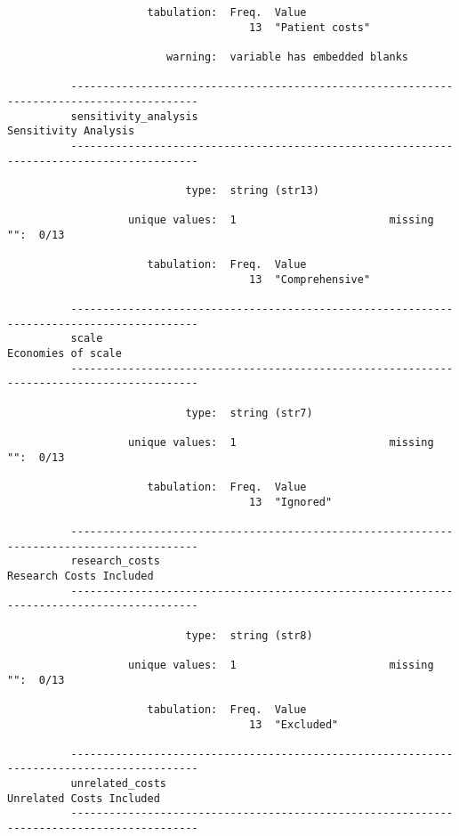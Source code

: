 \documentclass{article}
\begin{document}
\begin{verbatim}
                      tabulation:  Freq.  Value
                                      13  "Patient costs"
          
                         warning:  variable has embedded blanks
          
          ------------------------------------------------------------------------------------------
          sensitivity_analysis                                                  Sensitivity Analysis
          ------------------------------------------------------------------------------------------
          
                            type:  string (str13)
          
                   unique values:  1                        missing "":  0/13
          
                      tabulation:  Freq.  Value
                                      13  "Comprehensive"
          
          ------------------------------------------------------------------------------------------
          scale                                                                   Economies of scale
          ------------------------------------------------------------------------------------------
          
                            type:  string (str7)
          
                   unique values:  1                        missing "":  0/13
          
                      tabulation:  Freq.  Value
                                      13  "Ignored"
          
          ------------------------------------------------------------------------------------------
          research_costs                                                     Research Costs Included
          ------------------------------------------------------------------------------------------
          
                            type:  string (str8)
          
                   unique values:  1                        missing "":  0/13
          
                      tabulation:  Freq.  Value
                                      13  "Excluded"
          
          ------------------------------------------------------------------------------------------
          unrelated_costs                                                   Unrelated Costs Included
          ------------------------------------------------------------------------------------------
          

\end{verbatim}
\end{document}
